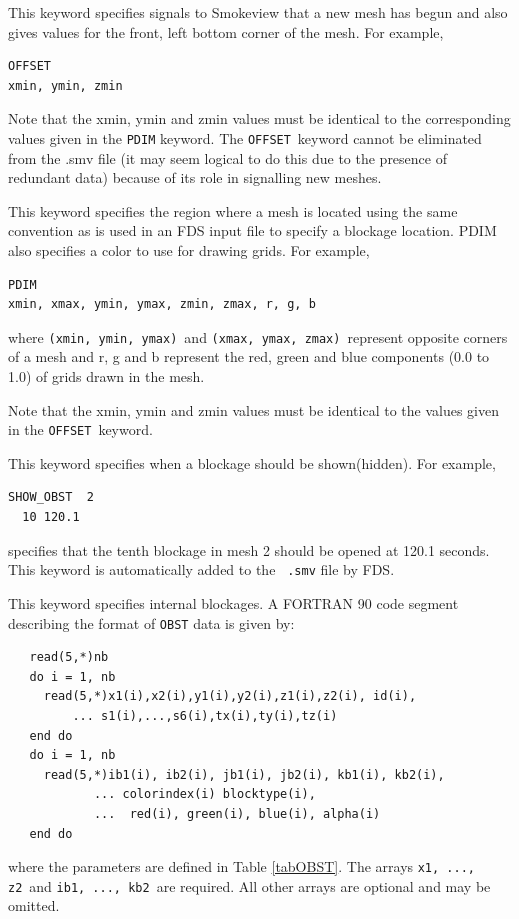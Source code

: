 \documentclass[11pt,twoside]{book}
\newcommand{\fds}{{FDS}}
\newcommand{\hitem}[1]{\item[{\bf #1} \hfill]}
\begin{document}
\hitem{OFFSET}This keyword specifies signals to Smokeview that a new mesh has begun and also
gives values for the front, left bottom corner of the mesh.  For example,
\begin{verbatim}
OFFSET
xmin, ymin, zmin
\end{verbatim}

Note that the xmin, ymin and zmin values must be identical to the corresponding values given in
the {\tt PDIM} keyword. The {\tt OFFSET}\ keyword cannot be eliminated from the .smv file
(it may seem logical to do this due
to the presence of redundant data) because of its role in signalling new meshes.

\hitem{PDIM}This keyword specifies the region where a mesh is located
using the same convention as is used in an FDS input file to specify a blockage location.
PDIM also specifies a color to use for drawing grids.  For example,
\begin{verbatim}
PDIM
xmin, xmax, ymin, ymax, zmin, zmax, r, g, b
\end{verbatim}
where {\tt (xmin,~ymin,~ymax)}\ and {\tt (xmax,~ymax,~zmax)}\  represent opposite corners of a mesh
and r, g and b represent the red, green and blue components (0.0 to 1.0) of grids drawn
in the mesh.

Note that the xmin, ymin and zmin values must be identical to the values given in the
{\tt OFFSET}\ keyword.


\hitem{SHOW\_OBST(HIDE\_OBST)} This keyword specifies when a
blockage should be shown(hidden). For example,
\begin{verbatim}
SHOW_OBST  2
  10 120.1
\end{verbatim}
specifies that the tenth blockage in mesh 2 should be opened at
120.1 seconds.  This keyword is automatically added to the {\tt
.smv} file by \fds.

\hitem{OBST}This keyword specifies internal blockages. A
FORTRAN 90 code segment describing the format of {\tt OBST}
data is given by:
\begin{verbatim}
   read(5,*)nb
   do i = 1, nb
     read(5,*)x1(i),x2(i),y1(i),y2(i),z1(i),z2(i), id(i),
         ... s1(i),...,s6(i),tx(i),ty(i),tz(i)
   end do
   do i = 1, nb
     read(5,*)ib1(i), ib2(i), jb1(i), jb2(i), kb1(i), kb2(i),
            ... colorindex(i) blocktype(i),
            ...  red(i), green(i), blue(i), alpha(i)
   end do
\end{verbatim}
where the parameters are defined in Table \ref{tabOBST}.  The arrays {\tt x1, ..., z2}\ and {\tt ib1, ..., kb2}\ are
required. All other arrays are optional and may be omitted.
\end{document}
